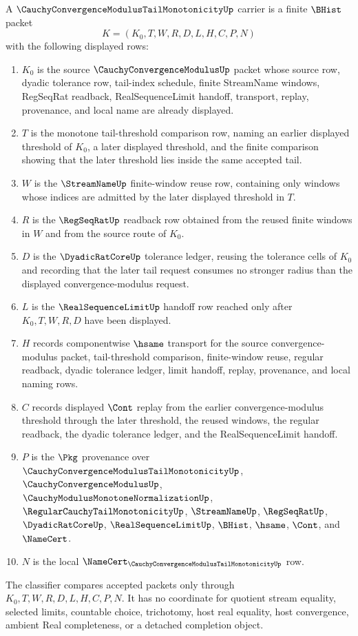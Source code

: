 \begin{definition}
\label{def:cauchy-convergence-modulus-tail-monotonicity-carrier}
A $\CauchyConvergenceModulusTailMonotonicityUp$ carrier is a finite $\BHist$ packet
$$
K=(K_0,T,W,R,D,L,H,C,P,N)
$$
with the following displayed rows:
\begin{enumerate}
\item $K_0$ is the source $\CauchyConvergenceModulusUp$ packet whose source row, dyadic tolerance row, tail-index schedule, finite StreamName windows, RegSeqRat readback, RealSequenceLimit handoff, transport, replay, provenance, and local name are already displayed.
\item $T$ is the monotone tail-threshold comparison row, naming an earlier displayed threshold of $K_0$, a later displayed threshold, and the finite comparison showing that the later threshold lies inside the same accepted tail.
\item $W$ is the $\StreamNameUp$ finite-window reuse row, containing only windows whose indices are admitted by the later displayed threshold in $T$.
\item $R$ is the $\RegSeqRatUp$ readback row obtained from the reused finite windows in $W$ and from the source route of $K_0$.
\item $D$ is the $\DyadicRatCoreUp$ tolerance ledger, reusing the tolerance cells of $K_0$ and recording that the later tail request consumes no stronger radius than the displayed convergence-modulus request.
\item $L$ is the $\RealSequenceLimitUp$ handoff row reached only after $K_0,T,W,R,D$ have been displayed.
\item $H$ records componentwise $\hsame$ transport for the source convergence-modulus packet, tail-threshold comparison, finite-window reuse, regular readback, dyadic tolerance ledger, limit handoff, replay, provenance, and local naming rows.
\item $C$ records displayed $\Cont$ replay from the earlier convergence-modulus threshold through the later threshold, the reused windows, the regular readback, the dyadic tolerance ledger, and the RealSequenceLimit handoff.
\item $P$ is the $\Pkg$ provenance over $\CauchyConvergenceModulusTailMonotonicityUp$, $\CauchyConvergenceModulusUp$, $\CauchyModulusMonotoneNormalizationUp$, $\RegularCauchyTailMonotonicityUp$, $\StreamNameUp$, $\RegSeqRatUp$, $\DyadicRatCoreUp$, $\RealSequenceLimitUp$, $\BHist$, $\hsame$, $\Cont$, and $\NameCert$.
\item $N$ is the local $\NameCert_{\CauchyConvergenceModulusTailMonotonicityUp}$ row.
\end{enumerate}
The classifier compares accepted packets only through $K_0,T,W,R,D,L,H,C,P,N$. It has no coordinate for quotient stream equality, selected limits, countable choice, trichotomy, host real equality, host convergence, ambient Real completeness, or a detached completion object.
\end{definition}

